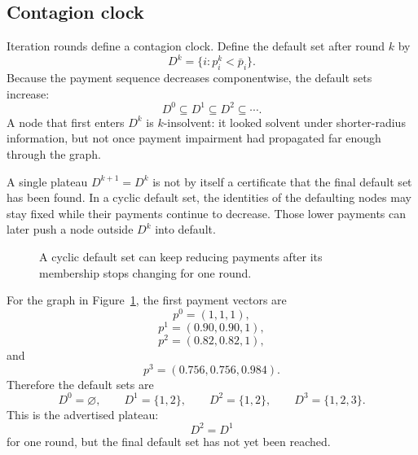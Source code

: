 \documentclass[11pt,oneside]{article}
\newcommand{\barp}{\bar p}
\begin{document}
\subsection{Contagion clock}
Iteration rounds define a contagion clock. Define the default set after
round $k$ by
\[
  D^k=\{i:p_i^k<\barp_i\}.
\]
Because the payment sequence decreases componentwise, the default sets increase:
\[
  D^0\subseteq D^1\subseteq D^2\subseteq\cdots.
\]
A node that first enters $D^k$ is $k$-insolvent: it looked solvent under
shorter-radius information, but not once payment impairment had propagated far
enough through the graph.

A single plateau $D^{k+1}=D^k$ is not by itself a certificate that the final
default set has been found. In a cyclic default set, the identities of the
defaulting nodes may stay fixed while their payments continue to decrease.
Those lower payments can later push a node outside $D^k$ into default.

\begin{figure}[h]
  \centering
  \caption{A cyclic default set can keep reducing payments after its membership
  stops changing for one round.}
  \label{fig:plateau-not-final}
\end{figure}

For the graph in Figure~\ref{fig:plateau-not-final}, the first payment vectors
are
\[
  p^0=(1,1,1),
\]
\[
  p^1=(0.90,0.90,1),
\]
\[
  p^2=(0.82,0.82,1),
\]
and
\[
  p^3=(0.756,0.756,0.984).
\]
Therefore the default sets are
\[
  D^0=\varnothing,\qquad
  D^1=\{1,2\},\qquad
  D^2=\{1,2\},\qquad
  D^3=\{1,2,3\}.
\]
This is the advertised plateau:
\[
  D^2=D^1
\]
for one round, but the final default set has not yet been reached.
\end{document}
